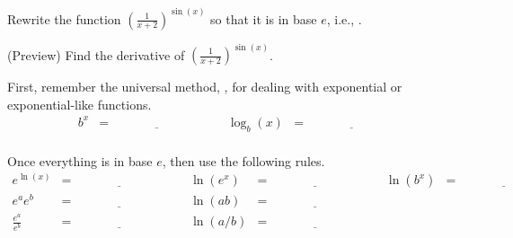 \documentclass[../main.tex]{subfiles}
\begin{document}
\begin{exercise}
  Rewrite the function \(\left(\frac{1}{x+2}\right)^{\sin(x)}\) so that it is in base \(e\), i.e., . 


  (Preview) Find the derivative of \(\left(\frac{1}{x+2}\right)^{\sin(x)}\). 

\end{exercise}
\clearpage

\begin{exercise}
  First, remember the universal method, , for dealing with exponential or exponential-like functions.
  \[
    \begin{array}{rclcrcl}
      b^{x} &=& \underline{\hspace{1in}} 
            &\hspace{1em} & 
      \log_{b}(x) &=& \underline{\hspace{1in}} \\[2ex]
    \end{array}
  \]

  Once everything is in base \(e\), then use the following rules.
  \[
    \begin{array}{rclcrclcrcl}
      e^{\ln(x)} &=& \underline{\hspace{1in}} 
                 &\hspace{1em} & 
      \ln(e^{x}) &=& \underline{\hspace{1in}} 
                 &\hspace{1em} & 
      \ln(b^{x}) &=& \underline{\hspace{1in}} 
      \\[2ex]
      e^{a} e^{b} &=& \underline{\hspace{1in}}
                  &\hspace{1em} & 
      \ln(ab) &=& \underline{\hspace{1in}} \\[2ex]
      \frac{e^{a}}{e^{b}} &=& \underline{\hspace{1in}}
                          &\hspace{1em} & 
      \ln(a/b) &=& \underline{\hspace{1in}} \\[2ex]
    \end{array}
  \]
\end{exercise}
\end{document}
